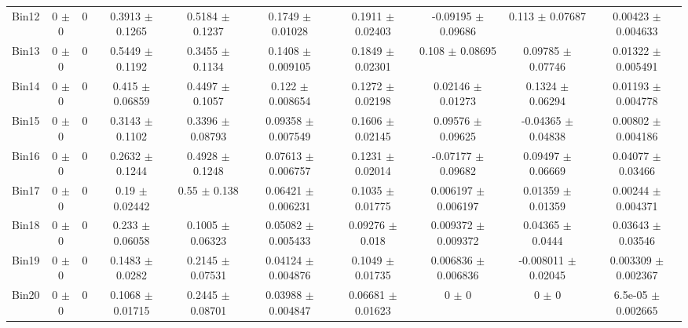 \begin{tabular}{@{\extracolsep{4pt}}lccccccccc@{}}
     Bin12 & 0 $\pm$ 0 & 0 & 0.3913 $\pm$ 0.1265 & 0.5184 $\pm$ 0.1237 & 0.1749 $\pm$ 0.01028 & 0.1911 $\pm$ 0.02403 & -0.09195 $\pm$ 0.09686 & 0.113 $\pm$ 0.07687 & 0.00423 $\pm$ 0.004633 \\ 
     Bin13 & 0 $\pm$ 0 & 0 & 0.5449 $\pm$ 0.1192 & 0.3455 $\pm$ 0.1134 & 0.1408 $\pm$ 0.009105 & 0.1849 $\pm$ 0.02301 & 0.108 $\pm$ 0.08695 & 0.09785 $\pm$ 0.07746 & 0.01322 $\pm$ 0.005491 \\ 
     Bin14 & 0 $\pm$ 0 & 0 & 0.415 $\pm$ 0.06859 & 0.4497 $\pm$ 0.1057 & 0.122 $\pm$ 0.008654 & 0.1272 $\pm$ 0.02198 & 0.02146 $\pm$ 0.01273 & 0.1324 $\pm$ 0.06294 & 0.01193 $\pm$ 0.004778 \\ 
     Bin15 & 0 $\pm$ 0 & 0 & 0.3143 $\pm$ 0.1102 & 0.3396 $\pm$ 0.08793 & 0.09358 $\pm$ 0.007549 & 0.1606 $\pm$ 0.02145 & 0.09576 $\pm$ 0.09625 & -0.04365 $\pm$ 0.04838 & 0.00802 $\pm$ 0.004186 \\ 
     Bin16 & 0 $\pm$ 0 & 0 & 0.2632 $\pm$ 0.1244 & 0.4928 $\pm$ 0.1248 & 0.07613 $\pm$ 0.006757 & 0.1231 $\pm$ 0.02014 & -0.07177 $\pm$ 0.09682 & 0.09497 $\pm$ 0.06669 & 0.04077 $\pm$ 0.03466 \\ 
     Bin17 & 0 $\pm$ 0 & 0 & 0.19 $\pm$ 0.02442 & 0.55 $\pm$ 0.138 & 0.06421 $\pm$ 0.006231 & 0.1035 $\pm$ 0.01775 & 0.006197 $\pm$ 0.006197 & 0.01359 $\pm$ 0.01359 & 0.00244 $\pm$ 0.004371 \\ 
     Bin18 & 0 $\pm$ 0 & 0 & 0.233 $\pm$ 0.06058 & 0.1005 $\pm$ 0.06323 & 0.05082 $\pm$ 0.005433 & 0.09276 $\pm$ 0.018 & 0.009372 $\pm$ 0.009372 & 0.04365 $\pm$ 0.0444 & 0.03643 $\pm$ 0.03546 \\ 
     Bin19 & 0 $\pm$ 0 & 0 & 0.1483 $\pm$ 0.0282 & 0.2145 $\pm$ 0.07531 & 0.04124 $\pm$ 0.004876 & 0.1049 $\pm$ 0.01735 & 0.006836 $\pm$ 0.006836 & -0.008011 $\pm$ 0.02045 & 0.003309 $\pm$ 0.002367 \\ 
     Bin20 & 0 $\pm$ 0 & 0 & 0.1068 $\pm$ 0.01715 & 0.2445 $\pm$ 0.08701 & 0.03988 $\pm$ 0.004847 & 0.06681 $\pm$ 0.01623 & 0 $\pm$ 0 & 0 $\pm$ 0 & 6.5e-05 $\pm$ 0.002665 \\ 
\hline\hline
  \end{tabular}
